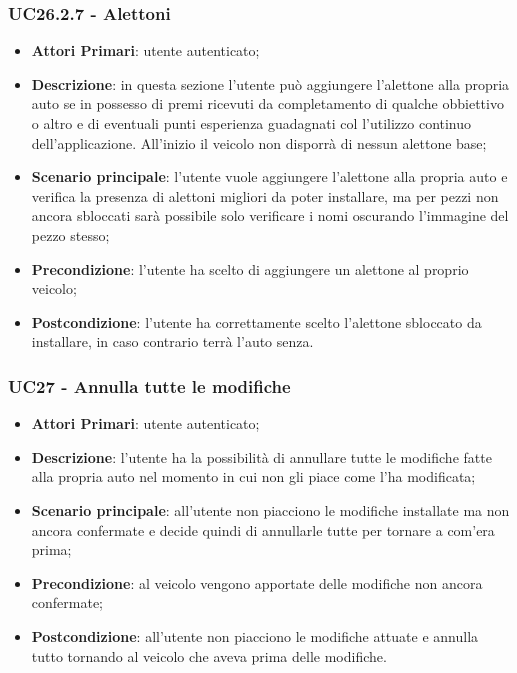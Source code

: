 \subsubsection{UC26.2.7 - Alettoni}
\begin{itemize}
	\item \textbf{Attori Primari}: utente autenticato;
	\item \textbf{Descrizione}: in questa sezione l'utente può aggiungere l'alettone alla propria auto se in possesso di premi ricevuti da completamento di qualche obbiettivo o altro e di eventuali punti esperienza guadagnati col l'utilizzo continuo dell'applicazione.
	All'inizio il veicolo non disporrà di nessun alettone base;
	\item \textbf{Scenario principale}: l'utente vuole aggiungere l'alettone alla propria auto e verifica la presenza di alettoni migliori da poter installare, ma per pezzi non ancora sbloccati sarà possibile solo verificare i nomi oscurando l'immagine del pezzo stesso;
	\item \textbf{Precondizione}: l'utente ha scelto di aggiungere un alettone al proprio veicolo; 
	\item \textbf{Postcondizione}: l'utente ha correttamente scelto l'alettone sbloccato da installare, in caso contrario terrà l'auto senza.
\end{itemize} 

\subsubsection{UC27 - Annulla tutte le modifiche}
\begin{itemize}
	\item \textbf{Attori Primari}: utente autenticato;
	\item \textbf{Descrizione}: l'utente ha la possibilità di annullare tutte le modifiche fatte alla propria auto nel momento in cui non gli piace come l'ha modificata;
	\item \textbf{Scenario principale}: all'utente non piacciono le modifiche installate ma non ancora confermate e decide quindi di annullarle tutte per tornare a com'era prima;
	\item \textbf{Precondizione}: al veicolo vengono apportate delle modifiche non ancora confermate; 
	\item \textbf{Postcondizione}: all'utente non piacciono le modifiche attuate e annulla tutto tornando al veicolo che aveva prima delle modifiche.
\end{itemize} 
